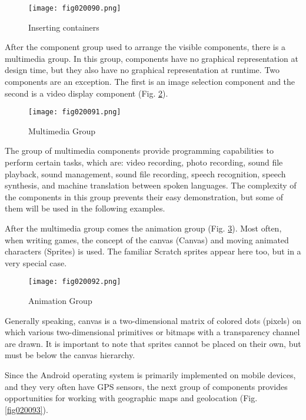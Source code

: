 \begin{figure}[H]
   \centering
   \texttt{[image: fig020090.png]}
   \caption{Inserting containers}
\label{fig020090}
\end{figure}

After the component group used to arrange the visible components, there is a multimedia group. In this group, components have no graphical representation at design time, but they also have no graphical representation at runtime. Two components are an exception. The first is an image selection component and the second is a video display component (Fig. \ref{fig020091}).

\begin{figure}[H]
   \centering
   \texttt{[image: fig020091.png]}
   \caption{Multimedia Group}
\label{fig020091}
\end{figure}

The group of multimedia components provide programming capabilities to perform certain tasks, which are: video recording, photo recording, sound file playback, sound management, sound file recording, speech recognition, speech synthesis, and machine translation between spoken languages. The complexity of the components in this group prevents their easy demonstration, but some of them will be used in the following examples.

After the multimedia group comes the animation group (Fig. \ref{fig020092}). Most often, when writing games, the concept of the canvas (Canvas) and moving animated characters (Sprites) is used. The familiar Scratch sprites appear here too, but in a very special case.

\begin{figure}[H]
   \centering
   \texttt{[image: fig020092.png]}
   \caption{Animation Group}
\label{fig020092}
\end{figure}

Generally speaking, canvas is a two-dimensional matrix of colored dots (pixels) on which various two-dimensional primitives or bitmaps with a transparency channel are drawn. It is important to note that sprites cannot be placed on their own, but must be below the canvas hierarchy.

Since the Android operating system is primarily implemented on mobile devices, and they very often have GPS sensors, the next group of components provides opportunities for working with geographic maps and geolocation (Fig. \ref{fig020093}).

